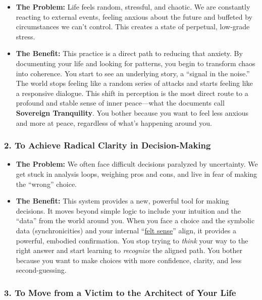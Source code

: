 \documentclass{article}
\begin{document}
\begin{itemize}
\item
  \textbf{The Problem:} Life feels random, stressful, and chaotic. We are constantly reacting to external events, feeling anxious about the future and buffeted by circumstances we can't control. This creates a state of perpetual, low-grade stress.
\item
  \textbf{The Benefit:} This practice is a direct path to reducing that anxiety. By documenting your life and looking for patterns, you begin to transform chaos into coherence. You start to see an underlying story, a ``signal in the noise.'' The world stops feeling like a random series of attacks and starts feeling like a responsive dialogue. This shift in perception is the most direct route to a profound and stable sense of inner peace---what the documents call \textbf{Sovereign Tranquility}. You bother because you want to feel less anxious and more at peace, regardless of what's happening around you.
\end{itemize}

\subsubsection*{2. To Achieve Radical Clarity in Decision-Making}\label{to-achieve-radical-clarity-in-decision-making}

\begin{itemize}
\item
  \textbf{The Problem:} We often face difficult decisions paralyzed by uncertainty. We get stuck in analysis loops, weighing pros and cons, and live in fear of making the ``wrong'' choice.
\item
  \textbf{The Benefit:} This system provides a new, powerful tool for making decisions. It moves beyond simple logic to include your intuition and the ``data'' from the world around you. When you face a choice and the symbolic data (synchronicities) and your internal ``\hyperlink{gloss:felt_sense}{felt sense}'' align, it provides a powerful, embodied confirmation. You stop trying to \emph{think} your way to the right answer and start learning to \emph{recognize} the aligned path. You bother because you want to make choices with more confidence, clarity, and less second-guessing.
\end{itemize}

\subsubsection*{3. To Move from a Victim to the Architect of Your Life}\label{to-move-from-a-victim-to-the-architect-of-your-life}
\end{document}
